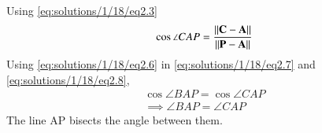 Using \eqref{eq:solutions/1/18/eq2.3}
\begin{align}
\cos\angle CAP=  \frac{\left\lVert\mathbf{C-A}\right\rVert}{\left\lVert\mathbf{P}-\mathbf{A}\right\rVert  }\label{eq:solutions/1/18/eq2.8}
  \end{align}
Using \eqref{eq:solutions/1/18/eq2.6} in \eqref{eq:solutions/1/18/eq2.7} and \eqref{eq:solutions/1/18/eq2.8},
\begin{align}
\cos\angle BAP=\cos\angle CAP \\
\implies \angle BAP=\angle CAP
\end{align}
The line AP bisects the angle between them.


